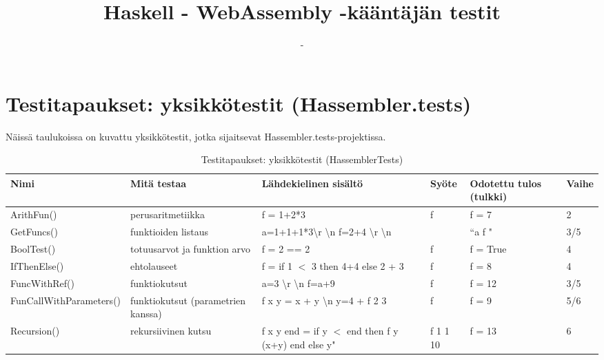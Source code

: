 \documentclass[11pt]{article} %
\title{Haskell - WebAssembly -kääntäjän testit}
\author{-}
\begin{document}
\maketitle


\section{Testitapaukset: yksikkötestit (Hassembler.tests)}

Näissä taulukoissa on kuvattu yksikkötestit, jotka sijaitsevat Hassembler.tests-projektissa.

\begin{table}[!htbp] %
\caption{Testitapaukset: yksikkötestit (HassemblerTests)}
\begin{tabular}{|p{3cm}|p{}|p{3cm}|p{}|p{3cm}|p{}|}
\hline
\textbf{Nimi} & \textbf{Mitä testaa} & \textbf{Lähdekielinen sisältö} & \textbf{Syöte}& \textbf{Odotettu tulos (tulkki)}  & \textbf{Vaihe} \\ \hline
 ArithFun()             & perus\-aritmetiikka         & f = 1+2*3  & f  & f = 7                                  &  2              \\ \hline
 GetFuncs()             & funktioiden listaus   & a=1+1+1*3\textbackslash r \textbackslash n f=2+4 \textbackslash r \textbackslash n &  &  ``a f "         &   3/5          \\ \hline
 BoolTest()    & totuusarvot ja funktion arvo  & f = 2 == 2   & f & f = True         & 4    \\ \hline
 IfThenElse()    & ehtolauseet                & f = if 1 $<$ 3 then 4+4 else 2 + 3   & f & f = 8         & 4    \\ \hline
 FuncWithRef()  & funktiokutsut      &   a=3 \textbackslash r \textbackslash n f=a+9          &  f         & f = 12   & 3/5                                        \\ \hline
 FunCallWith\-Parameters()   &  funktiokutsut (parametrien kanssa)  &  f x y = x + y \textbackslash n   y=4 + f 2 3 &      f & f = 9        &  5/6             \\ \hline
 Recursion()   & rekursiivinen kutsu      &  f x y end = if y $<$ end then f y (x+y) end else y"    & f 1 1 10  & f = 13         & 6         \\ \hline
\end{tabular}
\end{table}
\end{document}
